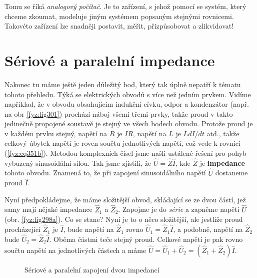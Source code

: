     Tomu se říká \emph{analogový počítač}. Je to zařízení, s jehož pomocí se systém, který chceme 
    zkoumat, modeluje jiným systémem popsaným stejnými rovnicemi. Takovéto zařízení lze snadněji 
    postavit, měřit, přizpůsobovat a zlikvidovat!
    
  \section{Sériové a paralelní impedance}\label{fyz:IchapXXVsecV}
    Nakonec tu máme ještě jeden důležitý bod, který tak úplně nepatří k tématu tohoto přehledu. 
    Týká se elektrických obvodů s více než jedním prvkem. Vidíme například, že v obvodu obsahujícím 
    indukční cívku, odpor a kondenzátor (např. na obr \ref{fyz:fig301}) prochází náboj všemi třemi 
    prvky, takže proud v takto jedinečně propojené soustavě je stejný ve všech bodech obvodu. 
    Protože proud je v každém prvku stejný, napětí na \(R\) je \(IR\), napětí na \(L\) je 
    \(LdI/dt\) atd., takže celkový úbytek napětí je roven součtu jednotlivých napětí, což vede k 
    rovnici (\ref{fyz:eq351b}). Metodou komplexních čísel jsme našli ustálené řešení pro pohyb 
    vybuzený sinusoidální silou. Tak jsme zjistili, že \(\hat{U}=\hat{Z}\hat{I}\), kde \(\hat{Z}\) 
    je \textbf{impedance} tohoto obvodu. Znamená to, že při zapojení sinusoidálního napětí 
    \(\hat{U}\) dostaneme proud \(\hat{I}\).
    
    Nyní předpokládejme, že máme složitější obvod, skládající se ze dvou částí, jež samy mají 
    nějaké impedance \(\hat{Z}_1\) a \(\hat{Z}_2\). Zapojme je do \emph{série} a zapněme napětí 
    \(\hat{U}\) (obr. \ref{fyz:fig298a}). Co se stane? Nyní je to o něco složitější, ale jestliže 
    proud procházející \(\hat{Z}_1\) je \(\hat{I}\), bude napětí na \(\hat{Z}_1\) rovno 
    \(\hat{U}_1=\hat{Z}_1\hat{I}\), a podobně, napětí na \(\hat{Z}_2\) bude 
    \(\hat{U}_2=\hat{Z}_2\hat{I}\). Oběma částmi teče stejný proud. Celkové napětí je pak rovno 
    součtu napětí na jednotlivých částech a máme \(\hat{U} = \hat{U}_1 + \hat{U}_2 = (\hat{Z}_1 + 
    \hat{Z}_2)\hat{I}\).

    \begin{figure}[ht!]      %
      \centering
      \caption{Sériové a paralelní zapojení dvou impedancí \cite[s.~342]{Feynman01}}
      \label{fyz:fig298}
    \end{figure}

